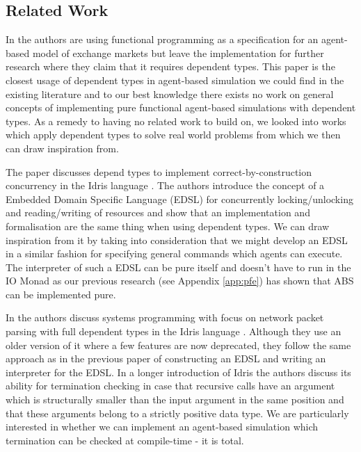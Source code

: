 \subsection{Related Work}
\label{sub:dep_abs_relwork}
In \cite{botta_functional_2011} the authors are using functional programming as a specification for an agent-based model of exchange markets but leave the implementation for further research where they claim that it requires dependent types. This paper is the closest usage of dependent types in agent-based simulation we could find in the existing literature and to our best knowledge there exists no work on general concepts of implementing pure functional agent-based simulations with dependent types. As a remedy to having no related work to build on, we looked into works which apply dependent types to solve real world problems from which we then can draw inspiration from. 

The paper \cite{brady_correct-by-construction_2010} discusses depend types to implement correct-by-construction concurrency in the Idris language \cite{brady_idris_2013}. The authors introduce the concept of a Embedded Domain Specific Language (EDSL) for concurrently locking/unlocking and reading/writing of resources and show that an implementation and formalisation are the same thing when using dependent types. We can draw inspiration from it by taking into consideration that we might develop an EDSL in a similar fashion for specifying general commands which agents can execute. The interpreter of such a EDSL can be pure itself and doesn't have to run in the IO Monad as our previous research (see Appendix \ref{app:pfe}) has shown that ABS can be implemented pure.

In \cite{brady_idris_2011} the authors discuss systems programming with focus on network packet parsing with full dependent types in the Idris language \cite{brady_idris_2013}. Although they use an older version of it where a few features are now deprecated, they follow the same approach as in the previous paper of constructing an EDSL and writing an interpreter for the EDSL. In a longer introduction of Idris the authors discuss its ability for termination checking in case that recursive calls have an argument which is structurally smaller than the input argument in the same position and that these arguments belong to a strictly positive data type. We are particularly interested in whether we can implement an agent-based simulation which termination can be checked at compile-time - it is total.

